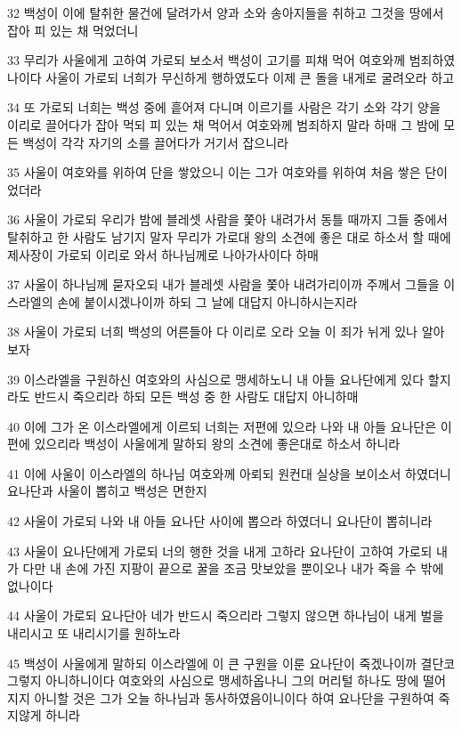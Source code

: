 \par 32 백성이 이에 탈취한 물건에 달려가서 양과 소와 송아지들을 취하고 그것을 땅에서 잡아 피 있는 채 먹었더니
\par 33 무리가 사울에게 고하여 가로되 보소서 백성이 고기를 피채 먹어 여호와께 범죄하였나이다 사울이 가로되 너희가 무신하게 행하였도다 이제 큰 돌을 내게로 굴려오라 하고
\par 34 또 가로되 너희는 백성 중에 흩어져 다니며 이르기를 사람은 각기 소와 각기 양을 이리로 끌어다가 잡아 먹되 피 있는 채 먹어서 여호와께 범죄하지 말라 하매 그 밤에 모든 백성이 각각 자기의 소를 끌어다가 거기서 잡으니라
\par 35 사울이 여호와를 위하여 단을 쌓았으니 이는 그가 여호와를 위하여 처음 쌓은 단이었더라
\par 36 사울이 가로되 우리가 밤에 블레셋 사람을 쫓아 내려가서 동틀 때까지 그들 중에서 탈취하고 한 사람도 남기지 말자 무리가 가로대 왕의 소견에 좋은 대로 하소서 할 때에 제사장이 가로되 이리로 와서 하나님께로 나아가사이다 하매
\par 37 사울이 하나님께 묻자오되 내가 블레셋 사람을 쫓아 내려가리이까 주께서 그들을 이스라엘의 손에 붙이시겠나이까 하되 그 날에 대답지 아니하시는지라
\par 38 사울이 가로되 너희 백성의 어른들아 다 이리로 오라 오늘 이 죄가 뉘게 있나 알아보자
\par 39 이스라엘을 구원하신 여호와의 사심으로 맹세하노니 내 아들 요나단에게 있다 할지라도 반드시 죽으리라 하되 모든 백성 중 한 사람도 대답지 아니하매
\par 40 이에 그가 온 이스라엘에게 이르되 너희는 저편에 있으라 나와 내 아들 요나단은 이편에 있으리라 백성이 사울에게 말하되 왕의 소견에 좋은대로 하소서 하니라
\par 41 이에 사울이 이스라엘의 하나님 여호와께 아뢰되 원컨대 실상을 보이소서 하였더니 요나단과 사울이 뽑히고 백성은 면한지
\par 42 사울이 가로되 나와 내 아들 요나단 사이에 뽑으라 하였더니 요나단이 뽑히니라
\par 43 사울이 요나단에게 가로되 너의 행한 것을 내게 고하라 요나단이 고하여 가로되 내가 다만 내 손에 가진 지팡이 끝으로 꿀을 조금 맛보았을 뿐이오나 내가 죽을 수 밖에 없나이다
\par 44 사울이 가로되 요나단아 네가 반드시 죽으리라 그렇지 않으면 하나님이 내게 벌을 내리시고 또 내리시기를 원하노라
\par 45 백성이 사울에게 말하되 이스라엘에 이 큰 구원을 이룬 요나단이 죽겠나이까 결단코 그렇지 아니하니이다 여호와의 사심으로 맹세하옵나니 그의 머리털 하나도 땅에 떨어지지 아니할 것은 그가 오늘 하나님과 동사하였음이니이다 하여 요나단을 구원하여 죽지않게 하니라
